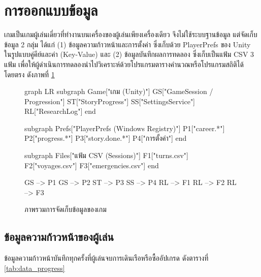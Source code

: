 
\section{การออกแบบข้อมูล}

เกมเป็นเกมผู้เล่นเดี่ยวที่ทำงานบนเครื่องของผู้เล่นเพียงเครื่องเดียว จึงไม่ใช้ระบบฐานข้อมูล แต่จัดเก็บข้อมูล 2 กลุ่ม ได้แก่ (1) ข้อมูลความก้าวหน้าและการตั้งค่า ซึ่งเก็บด้วย PlayerPrefs ของ Unity ในรูปแบบคู่คีย์และค่า (Key-Value) และ (2) ข้อมูลบันทึกผลการทดลอง ซึ่งเก็บเป็นแฟ้ม CSV 3 แฟ้ม เพื่อให้ผู้ดำเนินการทดลองนำไปวิเคราะห์ด้วยโปรแกรมตารางคำนวณหรือโปรแกรมสถิติได้โดยตรง ดังภาพที่ \ref{fig:data_overview}

\begin{figure}[!htbp]
\centering
\begin{mermaid}
graph LR
    subgraph Game["เกม (Unity)"]
        GS["GameSession / Progression"]
        ST["StoryProgress"]
        SS["SettingsService"]
        RL["ResearchLog"]
    end

    subgraph Prefs["PlayerPrefs (Windows Registry)"]
        P1["career.*"]
        P2["progress.*"]
        P3["story.done.*"]
        P4["การตั้งค่า"]
    end

    subgraph Files["แฟ้ม CSV (Sessions)"]
        F1["turns.csv"]
        F2["voyages.csv"]
        F3["emergencies.csv"]
    end

    GS --> P1
    GS --> P2
    ST --> P3
    SS --> P4
    RL --> F1
    RL --> F2
    RL --> F3
\end{mermaid}
\caption{ภาพรวมการจัดเก็บข้อมูลของเกม}
\label{fig:data_overview}
\end{figure}

\subsection{ข้อมูลความก้าวหน้าของผู้เล่น}

ข้อมูลความก้าวหน้าบันทึกทุกครั้งที่ผู้เล่นจบการเดินเรือหรือซื้ออัปเกรด ดังตารางที่ \ref{tab:data_progress}

